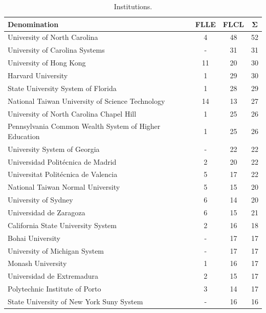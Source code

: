 \documentclass{textolivre}
\begin{document}
\begin{table}[htpb]
\caption{Institutions.}
\label{tbl-tabela-07}
\centering
\begin{tabular}{lccc}
\toprule
\textbf{Denomination} & \textbf{FLLE} & \textbf{FLCL} & \textbf{Σ} \\ 
\midrule
University of North Carolina                          & 4  & 48 & 52 \\ 
University of Carolina Systems                        & -  & 31 & 31 \\ 
University of Hong Kong                               & 11 & 20 & 30 \\ 
Harvard University                                    & 1  & 29 & 30 \\ 
State University System of Florida                    & 1  & 28 & 29 \\ 
National Taiwan University of Science Technology      & 14 & 13 & 27 \\ 
University of North Carolina Chapel Hill              & 1  & 25 & 26 \\ 
Pennsylvania Common Wealth System of Higher Education & 1  & 25 & 26 \\ 
University System of Georgia                          & -  & 22 & 22 \\ 
Universidad Politécnica de Madrid                     & 2  & 20 & 22 \\ 
Universitat Politécnica de Valencia                   & 5  & 17 & 22 \\ 
National Taiwan Normal University                     & 5  & 15 & 20 \\ 
University of Sydney                                  & 6  & 14 & 20 \\ 
Universidad de Zaragoza                               & 6  & 15 & 21 \\ 
California State University System                    & 2  & 16 & 18 \\ 
Bohai University                                      & -  & 17 & 17 \\ 
University of Michigan System                         & -  & 17 & 17 \\ 
Monash University                                     & 1  & 16 & 17 \\ 
Universidad de Extremadura                            & 2  & 15 & 17 \\ 
Polytechnic Institute of Porto                        & 3  & 14 & 17 \\ 
State University of New York Suny System              & -  & 16 & 16 \\ 

\end{tabular}
\end{table}
\end{document}
